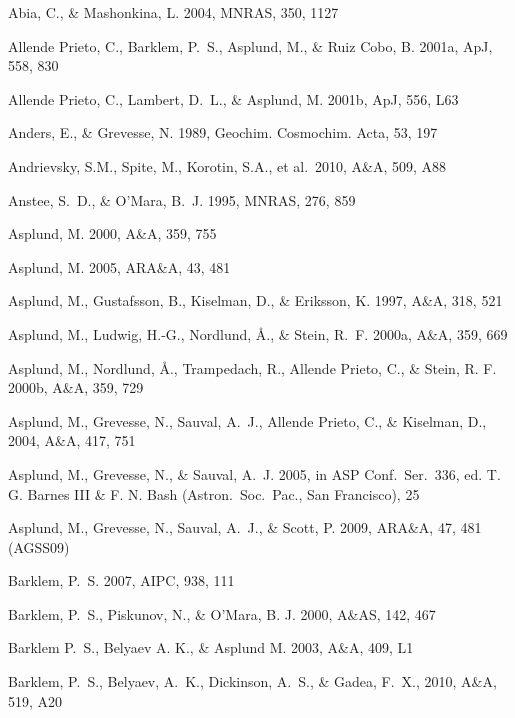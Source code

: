 \documentclass[traditabstract]{aa}
\begin{document}
\begin{thebibliography}{}

  Abia, C., \& Mashonkina, L. 2004, MNRAS, 350, 1127
 
  Allende Prieto, C., Barklem, P.~S., Asplund, M., \& Ruiz Cobo, B. 2001a, ApJ, 558, 830

  Allende Prieto, C., Lambert, D.~L., \& Asplund, M. 2001b, ApJ, 556, L63

  Anders, E., \& Grevesse, N. 1989, Geochim. Cosmochim. Acta, 53, 197
  
  Andrievsky, S.M., Spite, M., Korotin, S.A., et al.\ 2010, A\&A, 509, A88

  Anstee, S.~D., \& O'Mara, B.~J. 1995, MNRAS, 276, 859

  Asplund, M. 2000, A\&A, 359, 755 

  Asplund, M. 2005, ARA\&A, 43, 481

  Asplund, M., Gustafsson, B., Kiselman, D., \& Eriksson, K. 1997, A\&A, 318, 521

  Asplund, M., Ludwig, H.-G., Nordlund, \AA., \& Stein, R.~F. 2000a, A\&A, 359, 669

  Asplund, M., Nordlund, \AA., Trampedach, R., Allende Prieto, C., \& Stein, R. F. 2000b, A\&A, 359, 729

  Asplund, M., Grevesse, N., Sauval, A.~J., Allende Prieto, C., \& Kiselman, D., 2004, A\&A, 417, 751

  Asplund, M., Grevesse, N., \& Sauval, A.~J. 2005, in ASP Conf.\ Ser.\ 336, ed. T. G. Barnes III \& F. N. Bash (Astron.\ Soc.\ Pac., San Francisco), 25

  Asplund, M., Grevesse, N., Sauval, A.~J., \& Scott, P. 2009, ARA\&A, 47, 481 (AGSS09)

  Barklem, P.~S. 2007, AIPC, 938, 111

  Barklem, P.~S., Piskunov, N., \& O'Mara, B. J. 2000, A\&AS, 142, 467

  Barklem P.~S., Belyaev A. K., \& Asplund M. 2003, A\&A, 409, L1

  Barklem, P.~S., Belyaev, A.~K., Dickinson, A.~S., \& Gadea, F.~X., 2010, A\&A, 519, A20


\end{thebibliography}
\end{document}
